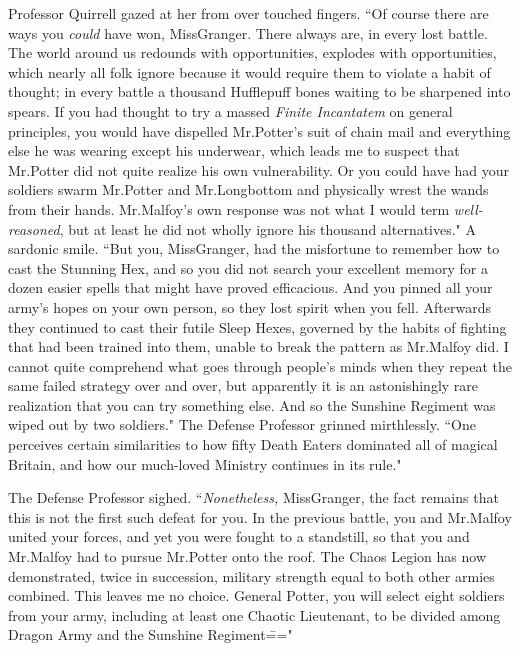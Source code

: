 Professor Quirrell gazed at her from over touched fingers. ``Of course there are ways you \emph{could} have won, Miss\?Granger. There always are, in every lost battle. The world around us redounds with opportunities, explodes with opportunities, which nearly all folk ignore because it would require them to violate a habit of thought; in every battle a thousand Hufflepuff bones waiting to be sharpened into spears. If you had thought to try a massed \emph{Finite Incantatem} on general principles, you would have dispelled Mr.\?Potter's suit of chain mail and everything else he was wearing except his underwear, which leads me to suspect that Mr.\?Potter did not quite realize his own vulnerability. Or you could have had your soldiers swarm Mr.\?Potter and Mr.\?Longbottom and physically wrest the wands from their hands. Mr.\?Malfoy's own response was not what I would term \emph{well-reasoned}, but at least he did not wholly ignore his thousand alternatives." A sardonic smile. ``But you, Miss\?Granger, had the misfortune to remember how to cast the Stunning Hex, and so you did not search your excellent memory for a dozen easier spells that might have proved efficacious. And you pinned all your army's hopes on your own person, so they lost spirit when you fell. Afterwards they continued to cast their futile Sleep Hexes, governed by the habits of fighting that had been trained into them, unable to break the pattern as Mr.\?Malfoy did. I cannot quite comprehend what goes through people's minds when they repeat the same failed strategy over and over, but apparently it is an astonishingly rare realization that you can try something else. And so the Sunshine Regiment was wiped out by two soldiers." The Defense Professor grinned mirthlessly. ``One perceives certain similarities to how fifty Death Eaters dominated all of magical Britain, and how our much-loved Ministry continues in its rule."

The Defense Professor sighed. ``\emph{Nonetheless,} Miss\?Granger, the fact remains that this is not the first such defeat for you. In the previous battle, you and Mr.\?Malfoy united your forces, and yet you were fought to a standstill, so that you and Mr.\?Malfoy had to pursue Mr.\?Potter onto the roof. The Chaos Legion has now demonstrated, twice in succession, military strength equal to both other armies combined. This leaves me no choice. General Potter, you will select eight soldiers from your army, including at least one Chaotic Lieutenant, to be divided among Dragon Army and the Sunshine Regiment\==="

